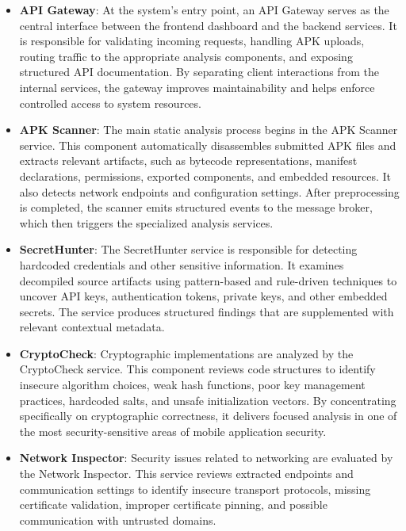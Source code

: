 \documentclass[preprint,12pt, a4paper]{elsarticle}
\begin{document}
\begin{itemize}
    \item \textbf{API Gateway}: At the system’s entry point, an API Gateway serves as the central interface between the frontend dashboard and the backend services. It is responsible for validating incoming requests, handling APK uploads, routing traffic to the appropriate analysis components, and exposing structured API documentation. By separating client interactions from the internal services, the gateway improves maintainability and helps enforce controlled access to system resources.

    \item \textbf{APK Scanner}: The main static analysis process begins in the APK Scanner service. This component automatically disassembles submitted APK files and extracts relevant artifacts, such as bytecode representations, manifest declarations, permissions, exported components, and embedded resources. It also detects network endpoints and configuration settings. After preprocessing is completed, the scanner emits structured events to the message broker, which then triggers the specialized analysis services.

    \item \textbf{SecretHunter}: The SecretHunter service is responsible for detecting hardcoded credentials and other sensitive information. It examines decompiled source artifacts using pattern-based and rule-driven techniques to uncover API keys, authentication tokens, private keys, and other embedded secrets. The service produces structured findings that are supplemented with relevant contextual metadata.

    \item \textbf{CryptoCheck}: Cryptographic implementations are analyzed by the CryptoCheck service. This component reviews code structures to identify insecure algorithm choices, weak hash functions, poor key management practices, hardcoded salts, and unsafe initialization vectors. By concentrating specifically on cryptographic correctness, it delivers focused analysis in one of the most security-sensitive areas of mobile application security.

    \item \textbf{Network Inspector}: Security issues related to networking are evaluated by the Network Inspector. This service reviews extracted endpoints and communication settings to identify insecure transport protocols, missing certificate validation, improper certificate pinning, and possible communication with untrusted domains.


\end{itemize}
\end{document}
